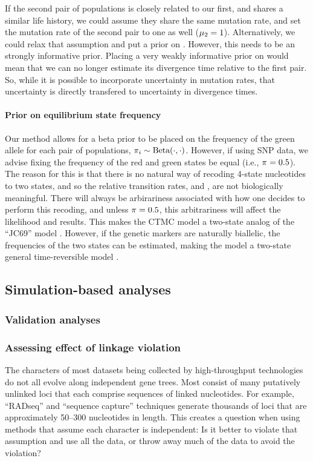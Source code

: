 If the second pair of populations is closely related to our first, and shares a similar life history,
we could assume they share the same mutation rate, and set the mutation rate of the second pair
to one as well ($\murate[2] = 1$).
Alternatively, we could relax that assumption and put a prior on \murate[2].
However, this needs to be an strongly informative prior.
Placing a very weakly informative prior on \murate[2] would mean that we can no
longer estimate its divergence time relative to the first pair.
So, while it is possible to incorporate uncertainty in mutation rates, that
uncertainty is directly transfered to uncertainty in divergence times.

\paragraph{Prior on equilibrium state frequency}
Our method allows for a beta prior to be placed on the frequency of the green
allele for each pair of populations,
$\gfreq[i] \sim \textrm{Beta}(\cdot, \cdot)$.
However, if using SNP data, we advise fixing the frequency of the red and green
states be equal (i.e., $\gfreq = 0.5$).
The reason for this is that there is no natural way of recoding 4-state
nucleotides to two states, and so the relative transition rates, \rgmurate and
\grmurate, are not biologically meaningful.
There will always be arbirariness associated with how one decides to perform
this recoding, and unless $\gfreq = 0.5$, this arbitrariness will affect the
likelihood and results.
This makes the CTMC model a two-state analog of the ``JC69'' model
\citep{JC1969}.
However, if the genetic markers are naturally biallelic, the frequencies of the
two states can be estimated, making the model a two-state general
time-reversible model \citep{Tavare1986}.



\subsection{Simulation-based analyses}

\subsubsection{Validation analyses}

\subsubsection{Assessing effect of linkage violation}
The characters of most datasets being collected by high-throughput technologies
do not all evolve along independent gene trees.
Most consist of many putatively unlinked loci that each comprise sequences of
linked nucleotides.
For example, ``RADseq'' and ``sequence capture'' techniques generate thousands
of loci that are approximately 50--300 nucleotides in length.
This creates a question when using methods that assume each character is
independent:
Is it better to violate that assumption and use all the data, or throw
away much of the data to avoid the violation?

